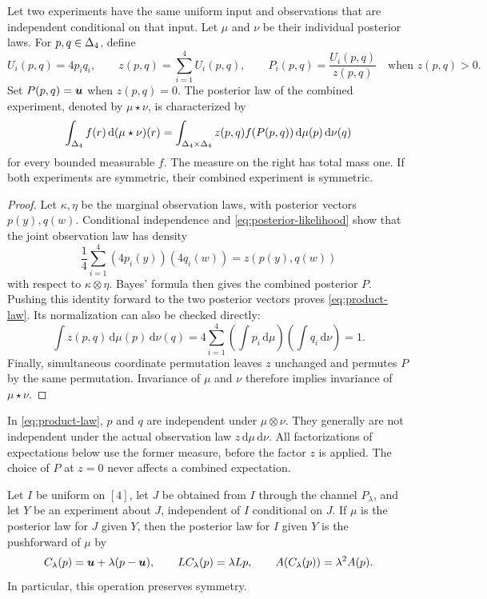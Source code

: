 \begin{lemma}
\label{lem:bayes-product}
Let two experiments have the same uniform input and observations that are
independent conditional on that input.  Let $\mu$ and $\nu$ be their
individual posterior laws.  For $p,q\in\Delta_4$, define
\[
  U_i(p,q)=4p_iq_i,
  \qquad z(p,q)=\sum_{i=1}^4U_i(p,q),
  \qquad P_i(p,q)=\frac{U_i(p,q)}{z(p,q)}
  \quad\text{when }z(p,q)>0.
\]
Set $P(p,q)=\boldsymbol u$ when $z(p,q)=0$.  The posterior law of the combined
experiment, denoted by $\mu\star\nu$, is characterized by
\begin{equation}
  \int_{\Delta_4} f(r)\,\mathrm d(\mu\star\nu)(r)
  =\int_{\Delta_4\times\Delta_4}
       z(p,q)f(P(p,q))\,\mathrm d\mu(p)\,\mathrm d\nu(q)
  \label{eq:product-law}
\end{equation}
for every bounded measurable $f$.  The measure on the right has total
mass one.  If both experiments are symmetric, their combined experiment
is symmetric.
\end{lemma}

\begin{proof}
Let $\kappa,\eta$ be the marginal observation laws, with posterior vectors
$p(y),q(w)$.  Conditional independence and
\eqref{eq:posterior-likelihood} show that the joint observation law has
density
\[
  \frac14\sum_{i=1}^4(4p_i(y))(4q_i(w))=z(p(y),q(w))
\]
with respect to $\kappa\otimes\eta$.  Bayes' formula then gives the
combined posterior $P$.  Pushing this identity forward to the two
posterior vectors proves \eqref{eq:product-law}.  Its normalization can
also be checked directly:
\[
  \int z(p,q)\,\mathrm d\mu(p)\,\mathrm d\nu(q)
  =4\sum_{i=1}^4
       \left(\int p_i\,\mathrm d\mu\right)
       \left(\int q_i\,\mathrm d\nu\right)=1.
\]
Finally, simultaneous coordinate permutation leaves $z$ unchanged and
permutes $P$ by the same permutation.  Invariance of $\mu$ and $\nu$
therefore implies invariance of $\mu\star\nu$.
\end{proof}

In \eqref{eq:product-law}, $p$ and $q$ are independent under
$\mu\otimes\nu$.  They generally are not independent under the actual
observation law $z\,\mathrm d\mu\,\mathrm d\nu$.  All factorizations of
expectations below use the former measure, before the factor $z$ is
applied.  The choice of $P$ at $z=0$ never affects a combined expectation.

\begin{lemma}
\label{lem:channel}
Let $I$ be uniform on $[4]$, let $J$ be obtained from $I$ through the
channel $P_\lambda$, and let $Y$ be an experiment about $J$, independent
of $I$ conditional on $J$.  If $\mu$ is the posterior law for $J$ given
$Y$, then the posterior law for $I$ given $Y$ is the pushforward of
$\mu$ by
\begin{equation}
  C_\lambda(p)=\boldsymbol u+\lambda(p-\boldsymbol u),
  \qquad L C_\lambda(p)=\lambda Lp,
  \qquad A(C_\lambda(p))=\lambda^2A(p).
  \label{eq:channel-scaling}
\end{equation}
In particular, this operation preserves symmetry.
\end{lemma}

